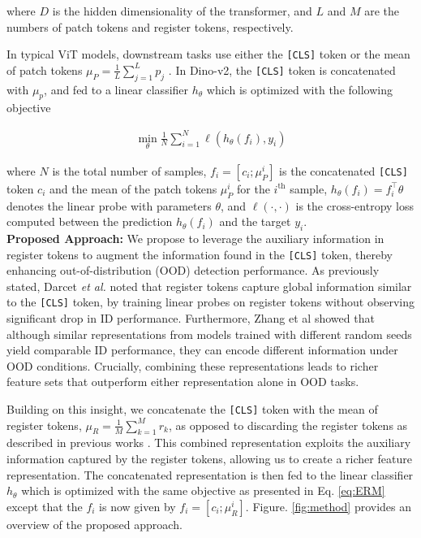 where $D$ is the hidden dimensionality of the transformer, and $L$ and $M$ are the numbers of patch tokens and register tokens, respectively. 

In typical ViT models, downstream tasks use either the \texttt{[CLS]} token or the mean of patch tokens $\mu_P = \frac{1}{L} \sum_{j=1}^L p_j$ \cite{Zhai_2022_CVPR,li2024inverse}. In Dino-v2, the \texttt{[CLS]} token is concatenated with $\mu_p$, and fed to a linear classifier $h_{\theta}$ which is optimized with the following objective 

\begin{align}
\min_{\theta} \frac{1}{N} \sum_{i=1}^{N} \ell(h_{\theta}(f_i), y_i)
\label{eq:ERM}
\end{align}

where $N$ is the total number of samples, $f_i = [c_i; \mu_P^i]$ is the concatenated  \texttt{[CLS]} token \( c_i \) and the mean of the patch tokens \( \mu_P^i \) for the \(i^\text{th}\) sample, $h_{\theta}(f_i) = f_i^\top \theta$ denotes the linear probe with parameters \( \theta \), and \( \ell(\cdot, \cdot) \) is the cross-entropy loss computed between the prediction \( h_{\theta}(f_i) \) and the target \( y_i \). \\


\noindent\textbf{Proposed Approach:}
We propose to leverage the auxiliary information in register tokens to augment the information found in the \texttt{[CLS]} token, thereby enhancing out-of-distribution (OOD) detection performance. As previously stated, Darcet \textit{et al.} \cite{darcet2024vision} noted that register tokens capture global information similar to the \texttt{[CLS]} token, by training linear probes on register tokens without observing significant drop in ID performance. Furthermore, Zhang et al \cite{zhang2023learning} showed that although similar representations from models trained with different random seeds yield comparable ID performance, they can encode different information under OOD conditions. Crucially, combining these representations leads to richer feature sets that outperform either representation alone in OOD tasks.


Building on this insight, we concatenate the \texttt{[CLS]} token with the mean of register tokens, $\mu_R = \frac{1}{M} \sum_{k=1}^M r_k$, as opposed to discarding the register tokens as described in previous works  \cite{darcet2024vision, hoptimus0}.  This combined representation exploits the auxiliary information captured by the register tokens, allowing us to create a richer feature representation. The concatenated representation is then fed to the linear classifier $h_{\theta}$ which is optimized with the same objective as presented in Eq. \ref{eq:ERM} except that the $f_i$ is now given by  $f_i = [c_i; \mu_R^i]$. Figure. \ref{fig:method} provides an overview of the proposed approach. 

